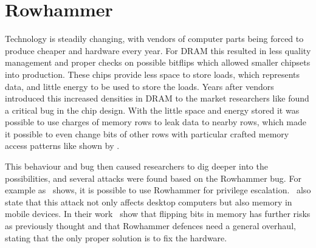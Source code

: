 \section{Rowhammer}

Technology is steadily changing, with vendors of computer parts being forced to
produce cheaper and hardware every year. For DRAM this resulted in less quality
management and proper checks on possible bitflips which allowed smaller chipsets
into production. These chips provide less space to store loads, which represents
data, and little energy to be used to store the loads. Years after vendors
introduced this increased densities in DRAM to the market researchers like
 found a critical bug in the chip design. With the
little space and energy stored it was possible to use charges of memory rows to
leak data to nearby rows, which made it possible to even change bits of other
rows with particular crafted memory access patterns like shown by
.

This behaviour and bug then caused researchers to dig deeper into the
possibilities, and several attacks were found based on the Rowhammer bug. For
example as~ shows, it is possible to use
Rowhammer for privilege escalation.~ also state that this
attack not only affects desktop computers but also memory in mobile devices. In
their work~ show that flipping bits in memory has
further risks as previously thought and that Rowhammer defences need a general
overhaul, stating that the only proper solution is to fix the hardware.

